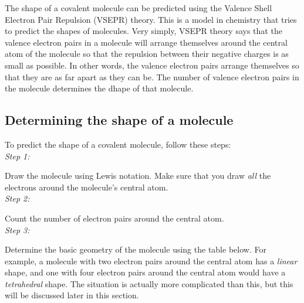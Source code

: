 The shape of a covalent molecule can be predicted using the Valence Shell Electron Pair Repulsion (VSEPR) theory. This is a model in chemistry that tries to predict the shapes of molecules. Very simply, VSEPR theory says that the valence electron pairs in a molecule will arrange themselves around the central atom of the molecule so that the repulsion between their negative charges is as small as possible. In other words, the valence electron pairs arrange themselves so that they are as far apart as they can be. The number of valence electron pairs in the molecule determines the dhape of that molecule.\\


\subsection{Determining the shape of a molecule}

To predict the shape of a covalent molecule, follow these steps:\\

\textit{Step 1:} 

Draw the molecule using Lewis notation. Make sure that you draw \textit{all} the electrons around the molecule's central atom.\\

\textit{Step 2:} 

Count the number of electron pairs around the central atom.\\

\textit{Step 3:} 

Determine the basic geometry of the molecule using the table below. For example, a molecule with two electron pairs around the central atom has a \textit{linear} shape, and one with four electron pairs around the central atom would have a \textit{tetrahedral} shape. The situation is actually more complicated than this, but this will be discussed later in this section.\\

